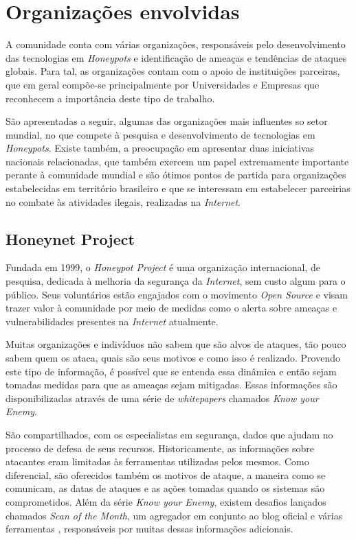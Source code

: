 \section{Organizações envolvidas}

A comunidade conta com várias organizações, responsáveis pelo desenvolvimento das tecnologias em \textit{Honeypots} e identificação de ameaças e tendências de ataques globais. Para tal, as organizações contam com o apoio de instituições parceiras, que em geral compõe-se principalmente por Universidades e Empresas que reconhecem a importância deste tipo de trabalho.

São apresentadas a seguir, algumas das organizações mais influentes so setor mundial, no que compete à pesquisa e desenvolvimento de tecnologias em \textit{Honeypots}. Existe também, a preocupação em apresentar duas iniciativas nacionais relacionadas, que também exercem um papel extremamente importante perante à comunidade mundial e são ótimos pontos de partida para organizações estabelecidas em território brasileiro e que se interessam em estabelecer parceirias no combate às atividades ilegais, realizadas na \textit{Internet}.


\subsection{Honeynet Project}


Fundada em 1999, o \textit{Honeypot Project} é uma organização internacional, de pesquisa, dedicada à melhoria da segurança da \textit{Internet}, sem custo algum para o público. Seus voluntários estão engajados com o movimento \textit{Open Source} e visam trazer valor à comunidade por meio de medidas como o alerta sobre ameaças e vulnerabilidades presentes na \textit{Internet} atualmente.

Muitas organizações e indivíduos não sabem que são alvos de ataques, tão pouco sabem quem os ataca, quais são seus motivos e como isso é realizado. Provendo este tipo de informação, é possível que se entenda essa dinâmica e então sejam tomadas medidas para que as ameaças sejam mitigadas. Essas informações são disponibilizadas através de uma série de \textit{whitepapers} chamados \textit{Know your Enemy}. \cite{KnowYourEnemy} \cite{KnowYourEnemy2}

São compartilhados, com os especialistas em segurança, dados que ajudam no processo de defesa de seus recursos. Historicamente, as informações sobre atacantes eram limitadas às ferramentas utilizadas pelos mesmos. Como diferencial, são oferecidos também os motivos de ataque, a maneira como se comunicam, as datas de ataques e as ações tomadas quando os sistemas são comprometidos. Além da série \textit{Know your Enemy}, existem desafios lançados chamados \textit{Scan of the Month}, um agregador em conjunto ao blog oficial \cite{Agregador} e várias ferramentas \cite{FerramentasHoneynet}, responsáveis por muitas dessas informações adicionais.


